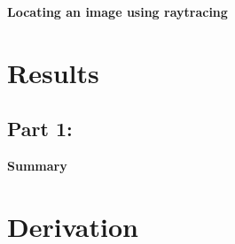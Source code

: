 \documentclass[twocolumn,english]{IEEEtran}
\theoremstyle{plain}
\theoremstyle{plain}
\begin{document}
\textbf{Locating an image using raytracing}



\section{Results}
  \subsection*{\textbf{Part 1: }}



  \textbf{Summary}


\appendices{}

\section{Derivation}\label{append:deriv}


%
%
\end{document}
